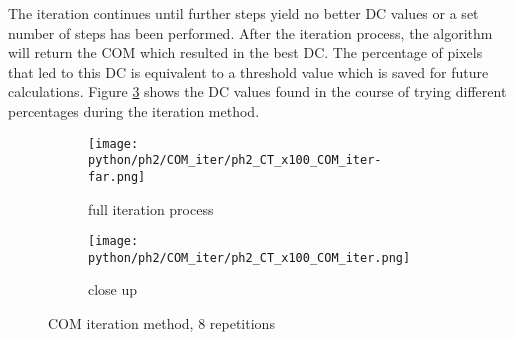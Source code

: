 The iteration continues until further steps yield no better DC values or a set number of steps has been performed.
After the iteration process, the algorithm will return the COM which resulted in the best DC.
The percentage of pixels that led to this DC is equivalent to a threshold value which is saved for future calculations.
Figure \ref{fig:COM_iteration} shows the DC values found in the course of trying different percentages during the iteration method.


\begin{figure}[!thb]
\centering
  \begin{subfigure}[b]{1\textwidth}
  \centering
    \texttt{[image: python/ph2/COM\_iter/ph2\_CT\_x100\_COM\_iter-far.png]}
    \caption{full iteration process}
    \label{fig:CT_x100_iteration}
  \end{subfigure}
  \begin{subfigure}[b]{1\textwidth}
  \centering
    \texttt{[image: python/ph2/COM\_iter/ph2\_CT\_x100\_COM\_iter.png]}
     \caption{close up}
     \label{fig:MR_x100_iteration}
  \end{subfigure}
  \caption{COM iteration method, 8 repetitions}
  \label{fig:COM_iteration}
\end{figure}

